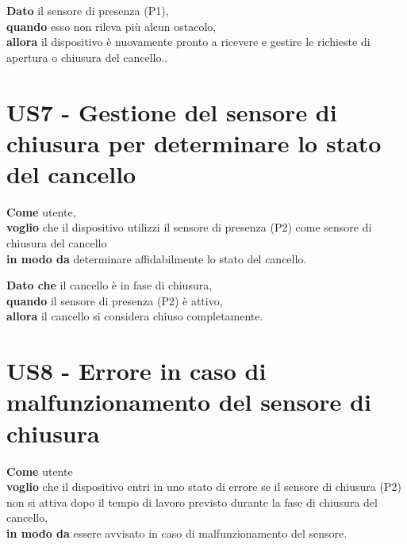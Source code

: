 \begin{tcolorbox}[title={Criterio di Accettazione \#2}, colback=blue!20!white, colframe=blue!80!black]
    \textbf{Dato} il sensore di presenza (P1), \\
    \textbf{quando} esso non rileva più alcun ostacolo, \\
    \textbf{allora} il dispositivo è nuovamente pronto a ricevere e gestire le richieste di apertura o chiusura del cancello..
\end{tcolorbox}

\section{US7 - Gestione del sensore di chiusura per determinare lo stato del cancello}
\begin{tcolorbox}[title={Descrizione}, colback=red!20!white, colframe=red!80!black]
    \textbf{Come} utente, \\
    \textbf{voglio} che il dispositivo utilizzi il sensore di presenza (P2) come sensore di chiusura del cancello\\
    \textbf{in modo da} determinare affidabilmente lo stato del cancello.
\end{tcolorbox}

\begin{tcolorbox}[title={Criterio di Accettazione}, colback=blue!20!white, colframe=blue!80!black]
    \textbf{Dato che} il cancello è in fase di chiusura, \\
    \textbf{quando} il sensore di presenza (P2) è attivo, \\
    \textbf{allora} il cancello si considera chiuso completamente.
\end{tcolorbox}

\section{US8 - Errore in caso di malfunzionamento del sensore di chiusura}
\begin{tcolorbox}[title={Descrizione}, colback=red!20!white, colframe=red!80!black]
    \textbf{Come} utente\\
    \textbf{voglio} che il dispositivo entri in uno stato di errore se il sensore di chiusura (P2) non si attiva dopo il tempo di lavoro previsto durante la fase di chiusura del cancello,\\
    \textbf{in modo da} essere avvisato in caso di malfunzionamento del sensore.
\end{tcolorbox}

